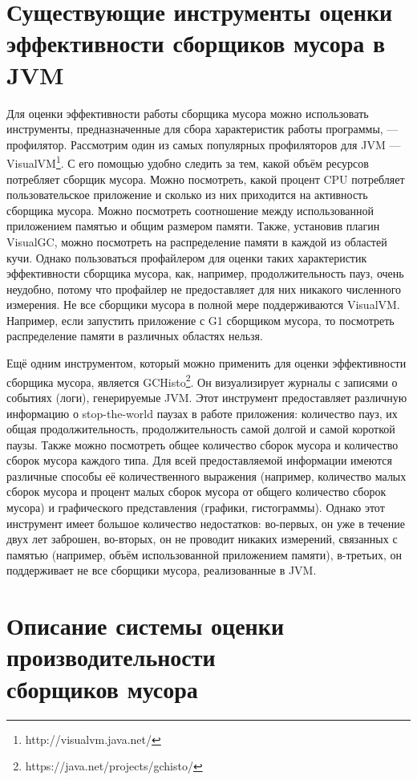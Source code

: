 \documentclass[12pt,a4paper]{article}
\begin{document}
\section{Существующие инструменты оценки\\эффективности сборщиков мусора в JVM}
Для оценки эффективности работы сборщика мусора можно использовать инструменты, 
предназначенные для сбора характеристик работы программы, --- профилятор. Рассмотрим 
один из самых популярных профиляторов для JVM --- VisualVM\footnote{http://visualvm.java.net/}.
С его помощью удобно
следить за тем, какой объём ресурсов потребляет сборщик мусора. Можно посмотреть,
какой процент CPU потребляет пользовательское приложение и сколько из них приходится
на активность сборщика мусора. Можно посмотреть соотношение между использованной
приложением памятью и общим размером памяти. Также, установив плагин VisualGC, можно
посмотреть на распределение памяти в каждой из областей кучи. Однако пользоваться 
профайлером для оценки таких характеристик эффективности сборщика мусора, как, например,
продолжительность пауз, очень неудобно, потому что профайлер не предоставляет для них 
никакого численного измерения. Не все сборщики мусора в полной мере поддерживаются 
VisualVM. Например, если запустить приложение с G1 сборщиком мусора, то посмотреть распределение
памяти в различных областях нельзя.

Ещё одним инструментом, который можно применить для оценки эффективности сборщика мусора,
является GCHisto\footnote{https://java.net/projects/gchisto/}. Он визуализирует журналы
с записями о событиях (логи), генерируемые JVM. Этот инструмент предоставляет различную 
информацию о stop-the-world паузах в работе приложения: количество пауз, их общая продолжительность,
продолжительность самой долгой и самой короткой паузы. Также можно посмотреть общее количество
сборок мусора и количество сборок мусора каждого типа. Для всей предоставляемой информации
имеются различные способы её количественного выражения (например, количество малых сборок мусора
и процент малых сборок мусора от общего количество сборок мусора) и графического представления
(графики, гистограммы). Однако этот инструмент имеет большое количество недостатков:
во-первых, он уже в течение двух лет заброшен, во-вторых, он не проводит никаких
измерений, связанных с памятью (например, объём использованной приложением памяти), в-третьих,
он поддерживает не все сборщики мусора, реализованные в JVM.

\newpage
\section{Описание системы оценки производительности\\сборщиков мусора}
\end{document}
